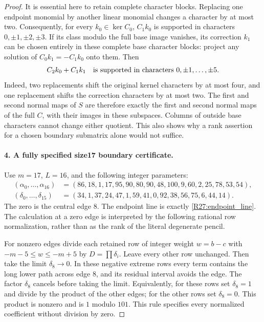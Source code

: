 \begin{proof}
It is essential here to retain complete character blocks.
Replacing one endpoint monomial by another linear monomial
changes a character by at most two. Consequently, for every
$k_0\in\ker C_0$, $C_1k_0$ is supported in characters
$0,\pm1,\pm2,\pm3$. If its class modulo the full base image
vanishes, its correction $k_1$ can be chosen entirely in these
complete base character blocks: project any solution of
$C_0k_1=-C_1k_0$ onto them. Then
\begin{equation}\label{R27:support}
 C_2k_0+C_1k_1
 \quad\hbox{is supported in characters }0,\pm1,\ldots,\pm5.
\end{equation}
Indeed, two replacements shift the original kernel characters
by at most four, and one replacement shifts the correction
characters by at most two. The first and second normal maps
of $S$ are therefore exactly the first and second normal maps
of the full $C$, with their images in these subspaces. Columns
of outside base characters cannot change either quotient.
This also shows why a rank assertion for a chosen boundary
submatrix alone would not suffice.

\paragraph{4. A fully specified size17 boundary certificate.}
Use $m=17$, $L=16$, and the following integer parameters:
\begin{align*}
 (\alpha_0,\ldots,\alpha_{16})
   &=(86,18,1,17,95,90,80,90,48,100,9,60,2,25,78,53,54),\\
 (\delta_0,\ldots,\delta_{15})
   &=(34,1,37,24,47,1,59,41,0,92,38,56,75,6,44,14).
\end{align*}
The zero is the central edge $8$. The endpoint line is exactly
\eqref{R27:endpoint_line}. The calculation at a zero edge is
interpreted by the following rational row normalization, rather
than as the rank of the literal degenerate pencil.

For nonzero edges divide each retained row of integer weight
$w=b-c$ with $-m-5\leq w\leq-m+5$ by $D=\prod\delta_i$.
Leave every other row unchanged. Then take the limit
$\delta_8\to0$. In these negative extreme rows every term
contains the long lower path across edge $8$, and its residual
interval avoids the edge. The factor $\delta_8$ cancels before
taking the limit. Equivalently, for these rows set
$\delta_8=1$ and divide by the product of the other edges;
for the other rows set $\delta_8=0$. This product is nonzero
and is $1$ modulo $101$. This rule specifies every normalized
coefficient without division by zero.


\end{proof}

